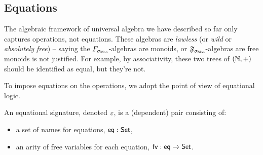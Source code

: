 \subsection{Equations}
\label{sec:universal-algebra:equations}

The algebraic framework of universal algebra we have described so far only captures operations, not equations.
%
These algebras are \emph{lawless} (or \emph{wild} or \emph{absolutely free}) --
saying the $\SigMon$-algebras are monoids, or $\mathfrak{F}_{\sigma_{\mathsf{Mon}}}$-algebras are free monoids is not justified.
%
For example, by associativity, these two trees of $(\mathbb{N}, +)$ should be identified as equal,
but they're not.
\begin{center}
\end{center}
%
To impose equations on the operations, we adopt the point of view of equational logic.

\begin{definition}
    An equational signature, denoted $\varepsilon$, is a (dependent) pair consisting of:
    \begin{itemize}
        \item a set of names for equations, $\operatorname{\mathsf{eq}} : \mathsf{Set}$,
        \item an arity of free variables for each equation, $\operatorname{\mathsf{fv}} : \operatorname{\mathsf{eq}} \to \mathsf{Set}$.
    \end{itemize}
\end{definition}

